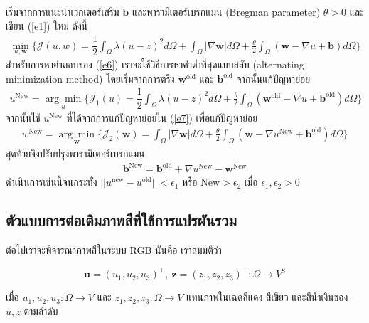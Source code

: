 \documentclass[hidelinks,a4paper]{article}
\numberwithin{equation}{section}							%
\begin{document}
{\begin{itemize}
	เริ่มจากการแนะนำเวกเตอร์เสริม $\boldsymbol{b}$ และพารามิเตอร์เบรกแมน (Bregman parameter) $\theta>0$ และเขียน (\ref{e1}) ใหม่ ดังนี้
	\begin{align}
	\min_{u,\boldsymbol{w}} \{ \mathcal{J}(u,w) = \dfrac{1}{2} \int_{\Omega} \lambda(u-z)^2 d\Omega +  \int_{\Omega}  |\nabla \boldsymbol{w}|  d\Omega + \frac{\theta}{2} \int_{\Omega} (\boldsymbol{w} - \nabla u + \boldsymbol{b}) d\Omega \}
	\label{e6}
	\end{align}
	สำหรับการหาคำตอบของ (\ref{e6}) เราจะใช้วิธีการหาค่าต่ำที่สุดแบบสลับ (alternating minimization method) โดยเริ่มจากการตรึง $\boldsymbol{w}^{\text{old}}$ และ $\boldsymbol{b}^{\text{old}}$ จากนั้นแก้ปัญหาย่อย
	\begin{align}
	u^{\text{New}}=\underset{u}{\arg\min} \{ \mathcal{J}_1(u) = \dfrac{1}{2} \int_{\Omega} \lambda(u-z)^2 d\Omega + \frac{\theta}{2} \int_{\Omega} (\boldsymbol{w}^{\text{old}} - \nabla u + \boldsymbol{b}^{\text{old}}) d\Omega \}
	\label{e7}
	\end{align}
	จากนั้นใช้ $u^{\text{New}}$ ที่ได้จากการแก้ปัญหาย่อยใน (\ref{e7}) เพื่อแก้ปัญหาย่อย
	\begin{align}
	w^{\text{New}}=\underset{\boldsymbol{w}}{\arg\min} \{ \mathcal{J}_2(\boldsymbol{w}) = \int_{\Omega}  |\nabla \boldsymbol{w}|  d\Omega  + \frac{\theta}{2} \int_{\Omega} (\boldsymbol{w} - \nabla u^{\text{New}} + \boldsymbol{b}^{\text{old}}) d\Omega \}
	\label{e8}
	\end{align}
	สุดท้ายจึงปรับปรุงพารามิเตอร์เบรกแมน 
	\begin{align}
	\boldsymbol{b}^{\text{New}}=\boldsymbol{b}^{\text{old}}+\nabla u^{\text{New}}-\boldsymbol{w}^{\text{New}}
	\label{e9}
	\end{align}
	ดำเนินการเช่นนี้จนกระทั่ง $||u^{\text{new}}-u^{\text{old}}||< \epsilon_1$ หรือ $\text{New}>\epsilon_2$ เมื่อ $\epsilon_1,\epsilon_2>0$ 
\end{itemize}

\subsection{ตัวแบบการต่อเติมภาพสีที่ใช้การแปรผันรวม}

\hspace{1cm} ต่อไปเราจะพิจารณาภาพสีในระบบ RGB นั่นคือ เราสมมติว่า

$$ \boldsymbol{u} = (u_1,u_2,u_3)^{\top},\ \boldsymbol{z} = (z_1,z_2,z_3)^{\top} : \Omega  \rightarrow V^3 $$

\noindent เมื่อ $u_1,u_2,u_3: \Omega  \rightarrow V$ และ $z_1,z_2,z_3: \Omega  \rightarrow V$ แทนภาพในเฉดสีแดง สีเขียว และสีน้ำเงินของ $u,z$ ตามลำดับ 

}
\end{document}
